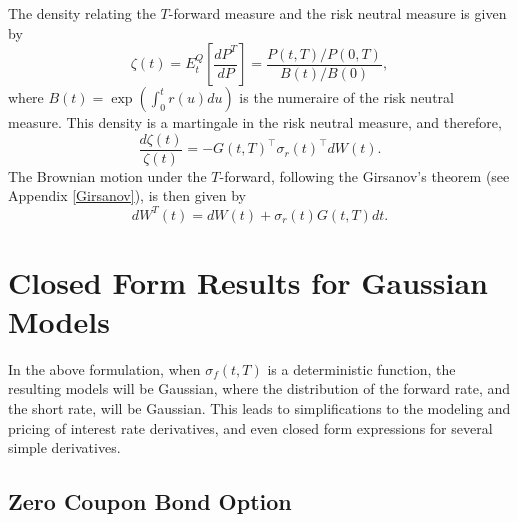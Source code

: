 \documentclass[12pt]{article}
\begin{document}
  The density relating the $T$-forward measure and the risk neutral measure is given by
  \begin{equation}
    \zeta(t)=E_t^Q\left[\frac{dP^T}{dP}\right]=\frac{P(t,T)/P(0,T)}{B(t)/B(0)},
  \end{equation}
  where $B(t)=\exp\left(\int_0^tr(u)du\right)$ is the numeraire of the risk neutral measure.
  This density is a martingale in the risk neutral measure, and therefore,
  \begin{equation}
    \frac{d\zeta(t)}{\zeta(t)}=-G(t,T)^{\top}\sigma_r(t)^{\top}dW(t).
  \end{equation}
  The Brownian motion under the $T$-forward, following the Girsanov's theorem (see Appendix \ref{Girsanov}), is then given by
  \begin{equation}
    dW^T(t)=dW(t)+\sigma_r(t)G(t,T)dt.
    \label{Tmeasure}
  \end{equation}


\section{Closed Form Results for Gaussian Models}

  In the above formulation, when $\sigma_f(t,T)$ is a deterministic function,
  the resulting models will be Gaussian, where the distribution of the forward rate, and the short rate, will be Gaussian.
  This leads to simplifications to the modeling and pricing of interest rate derivatives, and even closed form expressions
  for several simple derivatives.

  \subsection{Zero Coupon Bond Option}
\end{document}
